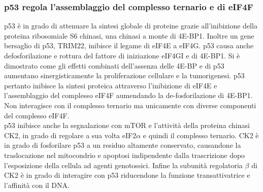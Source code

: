     \subsubsection{p53 regola l'assemblaggio del complesso ternario e di eIF4F}
    p53 \`e in grado di attenuare la sintesi globale di proteine grazie all'inibizione della proteina ribosomiale S6 chinasi, una chinasi a monte di 4E-BP1.
    Inoltre un gene bersaglio di p53, TRIM22, inibisce il legame di eIF4E a eIF4G.
    p53 causa anche defosforilazione e rottura del fattore di iniziazione eIF4GI e di 4E-BP1.
    Si \`e dimostrato come gli effetti combinati dell'assenza delle 4E-BP e di p53 aumentano sinergisticamente la proliferazione cellulare e la tumorigenesi.
    p53 pertanto inibisce la sintesi proteica attraverso l'inibizione di eIF4E e l'assemblaggio del complesso eIF4F aumendando la de-fosforilazione di 4E-BP1.
    Non interagisce con il complesso ternario ma unicamente con diverse componenti del complesso eIF4F.\\
    p53 inibisce anche la segnalazione con mTOR e l'attivit\`a della proteina chinasi CK2, in grado di regolare a sua volta eIF2$\alpha$ e quindi il complesso ternario.
    CK2 \`e in grado di fosforilare p53 a un residuo altamente conservato, causandone la traslocazione nel mitocondrio e apoptosi indipendente dalla trascrizione dopo l'esposizione della cellula ad agenti genotossici.
    Infine la subunit\`a regolatoria $\beta$ di CK2 \`e in grado di interagire con p53 riducendone la funzione transattivatrice e l'affinit\`a con il DNA.


